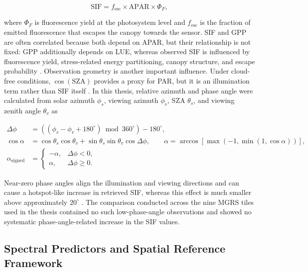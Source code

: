 \begin{equation}
\mathrm{SIF}=f_{\mathrm{esc}}\times\mathrm{APAR}\times\Phi_F,
\label{eq:sif_apar_background}
\end{equation}

where \(\Phi_F\) is fluorescence yield at the photosystem level and \(f_{\mathrm{esc}}\) is the fraction of emitted fluorescence that escapes the canopy towards the sensor. SIF and GPP are often correlated because both depend on APAR, but their relationship is not fixed: GPP additionally depends on LUE, whereas observed SIF is influenced by fluorescence yield, stress-related energy partitioning, canopy structure, and escape probability \cite{magney2020covariation,dechant2020canopy}. Observation geometry is another important influence. Under cloud-free conditions, \(\cos(\mathrm{SZA})\) provides a proxy for PAR, but it is an illumination term rather than SIF itself \cite{chen2020upscaling}. In this thesis, relative azimuth and phase angle were calculated from solar azimuth \(\phi_s\), viewing azimuth \(\phi_v\), SZA \(\theta_s\), and viewing zenith angle \(\theta_v\) as

\begin{align}
\Delta\phi &= \left((\phi_s-\phi_v+180^{\circ})\bmod 360^{\circ}\right)-180^{\circ},
\label{eq:relative_azimuth_background}\\
\cos\alpha &= \cos\theta_s\cos\theta_v
+\sin\theta_s\sin\theta_v\cos\Delta\phi,
\qquad
\alpha=\arccos\!\left[\max\!\left(-1,\min\!\left(1,\cos\alpha\right)\right)\right],
\label{eq:phase_angle_background}\\
\alpha_{\mathrm{signed}} &=
\begin{cases}
-\alpha, & \Delta\phi<0,\\
\alpha, & \Delta\phi\geq0.
\end{cases}
\label{eq:signed_phase_angle_background}
\end{align}

Near-zero phase angles align the illumination and viewing directions and can cause a hotspot-like increase in retrieved SIF, whereas this effect is much smaller above approximately \(20^{\circ}\) \cite{kohler2018global,joiner2020systematic,doughty2022global}. The comparison conducted across the nine MGRS tiles used in the thesis contained no such low-phase-angle observations and showed no systematic phase-angle-related increase in the SIF values.

\subsection{Spectral Predictors and Spatial Reference Framework}

